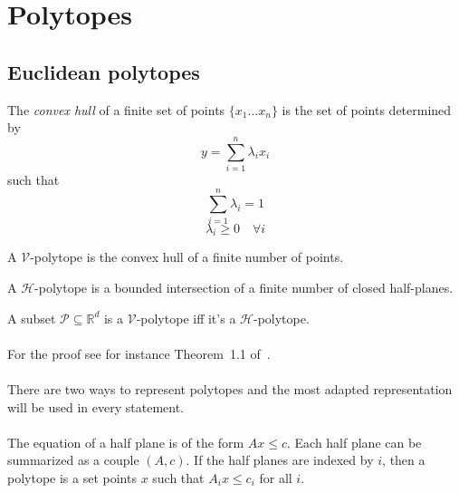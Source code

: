 \section{Polytopes}

\subsection{Euclidean polytopes}
\begin{definition}
  The \textit{convex hull} of a finite set of points $\{x_1 \dots x_n\}$ is the set of points determined by
  \[
    y = \sum_{i=1}^n \lambda_i x_i
  \]
  such that
  \[
    \sum_{i=1}^n \lambda_i = 1
  \]
  \[
    \lambda_i \ge 0 \quad \forall i
  \]
\end{definition}

\begin{definition}
  A $\mathcal V$-polytope is the convex hull of a finite number of points.
\end{definition}

\begin{definition}
  A $\mathcal H$-polytope is a bounded intersection of a finite number of closed half-planes.
\end{definition}

\begin{theorem}
  A subset $\mathcal P \subseteq \mathbb R^d$ is a $\mathcal V$-polytope iff it's a $\mathcal H$-polytope.
\end{theorem}

\paragraph{}
For the proof see for instance Theorem~1.1 of~\cite{polytopes}.

\paragraph{}
There are two ways to represent polytopes and the most adapted representation will be used in every statement.

\paragraph{}
The equation of a half plane is of the form $Ax \le c$. Each half plane can be summarized as a couple $(A,c)$. If the half planes are indexed by $i$, then a polytope is a set points $x$ such that $A_i x \le c_i$ for all $i$.

